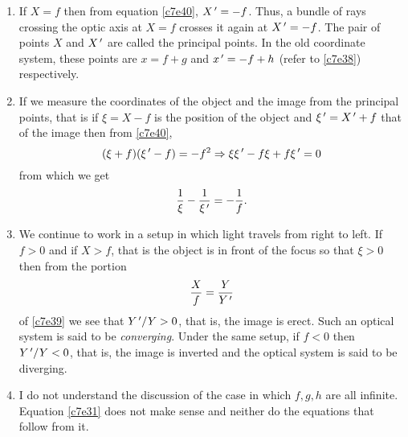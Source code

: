 \begin{enumerate}
\item If $X = f$ then from equation \eqref{c7e40}, $X^{\,\prime} = -f$. Thus, a bundle
of rays crossing the optic axis at $X = f$ crosses it again at $X^{\,\prime} = -f$.
The pair of points $X$ and $X^{\,\prime}$ are called the principal points. In the
old coordinate system, these points are $x = f + g$ and $x^{\,\prime} = -f + h$ (refer
to \eqref{c7e38}) respectively.

\item If we measure the coordinates of the object and the image from the
principal points, that is if $\xi = X - f$ is the position of the object and
$\xi^{\,\prime} = X^{\,\prime} + f$ that of the image then from \eqref{c7e40},
\[
(\xi + f)(\xi^{\,\prime} - f) = -f^2 \Rightarrow \xi\xi^{\,\prime} - f\xi + f\xi^{\,\prime} = 0
\]
from which we get
\begin{equation}\label{c7e42}
\frac{1}{\xi} - \frac{1}{\xi^{\,\prime}} = -\frac{1}{f}.
\end{equation}

\item We continue to work in a setup in which light travels from right to left.
If $f > 0$ and if $X > f$, that is the object is in front of the focus so that
$\xi > 0$ then from the portion
\[
\frac{X}{f} = \frac{Y}{Y^{\,\prime}}
\]
of \eqref{c7e39} we see that $Y^{\,\prime}/Y > 0$, that is, the image is erect. Such
an optical system is said to be \emph{converging}. Under the same setup, if
$f < 0$ then $Y^{\,\prime}/Y < 0$, that is, the image is inverted and the optical 
system is said to be diverging.

\item I do not understand the discussion of the case in which $f, g, h$ are all
infinite. Equation \eqref{c7e31} does not make sense and neither do the 
equations that follow from it. 
\end{enumerate}
